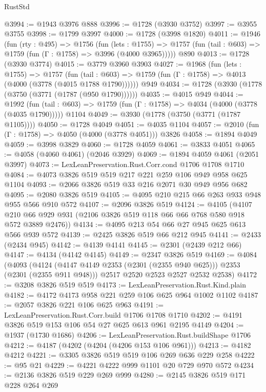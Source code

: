 \begin{lexlean}{RustStd}
\begin{coremodule}
@3994 := @1943 @3976 @888
@3996 := @1728 (@3930 @3752)
@3997 := @3955 @3755
@3998 := @1799 @3997
@4000 := @1728 (@3998 @1820)
@4011 := @1946
    (fun (rty : @495) =>
    @1756
      (fun (lets : @1755) =>
      @1757 (fun (tail : @603) => @1759 (fun (Γ : @1758) => @3996 (@4000 @3965)))))
    @890
@4013 := @1728 (@3930 @3774)
@4015 := @3779 @3960 @3903
@4027 := @1968
    (fun (lets : @1755) =>
    @1757
      (fun (tail : @603) => @1759 (fun (Γ : @1758) => @4013 (@4000 (@3778 (@4015 @1788 @1790))))))
    @949
@4034 := @1728 (@3930 (@1778 (@3750 (@3771 (@1787 (@950 @1790))))))
@4035 := @4015 @949
@4044 := @1992
    (fun (tail : @603) => @1759 (fun (Γ : @1758) => @4034 (@4000 (@3778 (@4035 @1790)))))
    @1104
@4049 := @3930 (@1778 (@3750 (@3771 (@1787 @1105))))
@4050 := @1728 @4049
@4051 := @4035 @1104
@4057 := @2010 (fun (Γ : @1758) => @4050 (@4000 (@3778 @4051))) @3826
@4058 := @1894 @4049
@4059 := @3998 @3829
@4060 := @1728 @4059
@4061 := @3833 @4051
@4065 := @4058 (@4060 @4061) (@2046 @3929)
@4069 := @1894 @4059 @4061 (@2051 @3997)
@4073 := LexLeanPreservation.Rust.Corr.cond @1706 @1708 @1710
@4084 := @4073 @3826 @519 @519 @217 @221 @259 @106 @949 @958 @625 @1104
@4093 := @2066 @3826 @519 @33 @216 @2071 @30 @949 @956 @682
@4095 := @2080 @3826 @519
@4105 := @4095 @210 @215 @66 @263 @933 @948 @955 @566 @910 @572
@4107 := @2096 @3826 @519
@4124 := @4105
    (@4107 @210 @66 @929 @931 (@2106 @3826 @519 @118 @66 @66 @768 @580 @918 @572 @3889 @2476))
@4134 := @4095 @213 @54 @66 @27 @945 @625 @613 @566 @939 @572
@4139 := @2425 @3826 @519 @66 @212 @945
@4141 := @2433 (@2434 @945)
@4142 := @4139 @4141
@4145 := @2301 (@2439 @212 @66)
@4147 := @4134 (@4142 @4145)
@4149 := @2347 @3826 @519
@4169 := @4084
    (@4093
      (@4124 (@4147 @4149 @2353 (@2301 (@2355 @940 @625))) @2353 (@2301 (@2355 @911 @948)))
      @2517
      @2520
      @2523
      @2527
      @2532
      @2538)
@4172 := @3208 @3826 @519 @519
@4173 := LexLeanPreservation.Rust.Kind.plain
@4182 := @4172 @4173 @958 @221 @259 @106 @625 @964 @1002 @1102
@4187 := @2057 @3826 @221 @106 @625 @963
@4191 := LexLeanPreservation.Rust.Corr.build @1706 @1708 @1710
@4202 := @4191 @3826 @519 @153 @106 @54 @27 @625 @613 @961 @2195 @4149
@4204 := @1937 (@1730 @1686)
@4206 := LexLeanPreservation.Rust.buildShape @1706
@4212 := @4187 (@4202 (@4204 (@4206 @153 @106 @961)))
@4213 := @4182 @4212
@4221 := @3305 @3826 @519 @519 @106 @269 @636 @229 @258
@4222 := @95 @21
@4229 := @4221 @4222 @999 @1101 @20 @729 @970 @572
@4234 := @2136 @3826 @519 @229 @269 @999
@4280 := @2145
    @3826
    @519
    @171
    @228
    @264
    @269

\end{coremodule}
\end{lexlean}
